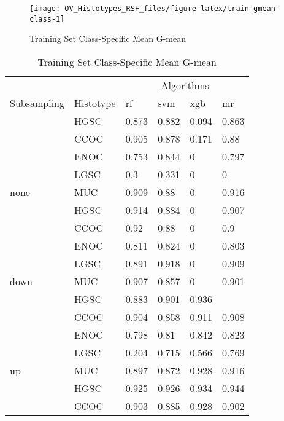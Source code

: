 \documentclass[
]{report}
\begin{document}
\begin{figure}[H]

{\centering \texttt{[image: OV\_Histotypes\_RSF\_files/figure-latex/train-gmean-class-1]} 

}

\caption{Training Set Class-Specific Mean G-mean}\label{fig:train-gmean-class}
\end{figure}

\begin{table}

\caption{\label{tab:train-gmean-class-table}Training Set Class-Specific Mean G-mean}
\centering
\begin{tabular}[t]{l|l|l|l|l|l}
\hline
\multicolumn{2}{c|}{ } & \multicolumn{4}{c}{Algorithms} \\
\cline{3-6}
Subsampling & Histotype & rf & svm & xgb & mr\\
\hline
 & HGSC & 0.873 & 0.882 & 0.094 & 0.863\\
\cline{2-6}
 & CCOC & 0.905 & 0.878 & 0.171 & 0.88\\
\cline{2-6}
 & ENOC & 0.753 & 0.844 & 0 & 0.797\\
\cline{2-6}
 & LGSC & 0.3 & 0.331 & 0 & 0\\
\cline{2-6}
\multirow{-5}{*}{\raggedright\arraybackslash none} & MUC & 0.909 & 0.88 & 0 & 0.916\\
\cline{1-6}
 & HGSC & 0.914 & 0.884 & 0 & 0.907\\
\cline{2-6}
 & CCOC & 0.92 & 0.88 & 0 & 0.9\\
\cline{2-6}
 & ENOC & 0.811 & 0.824 & 0 & 0.803\\
\cline{2-6}
 & LGSC & 0.891 & 0.918 & 0 & 0.909\\
\cline{2-6}
\multirow{-5}{*}{\raggedright\arraybackslash down} & MUC & 0.907 & 0.857 & 0 & 0.901\\
\cline{1-6}
 & HGSC & 0.883 & 0.901 & 0.936 & \cellcolor[HTML]{90ee90}{0.946}\\
\cline{2-6}
 & CCOC & 0.904 & 0.858 & 0.911 & 0.908\\
\cline{2-6}
 & ENOC & 0.798 & 0.81 & 0.842 & 0.823\\
\cline{2-6}
 & LGSC & 0.204 & 0.715 & 0.566 & 0.769\\
\cline{2-6}
\multirow{-5}{*}{\raggedright\arraybackslash up} & MUC & 0.897 & 0.872 & 0.928 & 0.916\\
\cline{1-6}
 & HGSC & 0.925 & 0.926 & 0.934 & 0.944\\
\cline{2-6}
 & CCOC & 0.903 & 0.885 & 0.928 & 0.902\\

\end{tabular}
\end{table}
\end{document}
